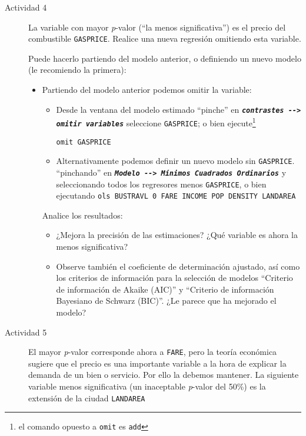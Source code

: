 \documentclass[11pt]{article}
\begin{document}
\begin{description}
\item[{Actividad 4}] La variable con mayor \emph{p}-valor (``la menos
significativa'') es el precio del combustible \texttt{GASPRICE}.
Realice una nueva regresión omitiendo esta variable.

Puede hacerlo partiendo del modelo anterior, o definiendo un nuevo
modelo (le recomiendo la primera):

\begin{itemize}
\item Partiendo del modelo anterior podemos omitir la variable:

\begin{itemize}
\item Desde la ventana del modelo estimado ``pinche'' en \textbf{\emph{\texttt{contrastes
      -{}-> omitir variables}}} seleccione \texttt{GASPRICE}; o bien
ejecute\footnote{el comando opuesto a \texttt{omit} es \texttt{add}}
\begin{verbatim}
omit GASPRICE
\end{verbatim}

\item Alternativamente podemos definir un nuevo modelo sin \texttt{GASPRICE}.
``pinchando'' en \textbf{\emph{\texttt{Modelo -{}-> Mínimos Cuadrados Ordinarios}}} y
seleccionando todos los regresores menos \texttt{GASPRICE}, o bien ejecutando
\texttt{ols BUSTRAVL 0 FARE INCOME POP DENSITY LANDAREA}
\end{itemize}

Analice los resultados:

\begin{itemize}
\item ¿Mejora la precisión de las estimaciones? ¿Qué variable es ahora
la menos significativa?

\item Observe también el coeficiente de determinación ajustado, así
como los criterios de información para la selección de modelos
``Criterio de información de Akaike (AIC)'' y ``Criterio de
información Bayesiano de Schwarz (BIC)''. ¿Le parece que ha
mejorado el modelo?
\end{itemize}
\end{itemize}

\item[{Actividad 5}] El mayor \emph{p}-valor corresponde ahora a \texttt{FARE}, pero
la teoría económica sugiere que el precio es una importante variable
a la hora de explicar la demanda de un bien o servicio. Por ello la
debemos mantener. La siguiente variable menos significativa (un
inaceptable \emph{p}-valor del 50\%) es la extensión de la ciudad
\texttt{LANDAREA}


\end{description}
\end{document}
